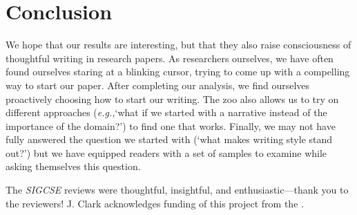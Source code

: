 \documentclass[sigconf]{acmart}
\newcommand{\eg}{\textit{e.g.,}\xspace}
\begin{document}
	\section{Conclusion}

We hope that our results are interesting, but that they also raise consciousness of thoughtful writing in research papers. 
As researchers ourselves, we have often found ourselves staring at a blinking cursor, trying to come up with a compelling way to start our paper. After completing our analysis, we find ourselves proactively choosing how to start our writing. The zoo also allows us to try on different approaches (\eg `what if we started with a narrative instead of the importance of the domain?') to find one that works. Finally, we may not have fully answered the question we started with (`what makes writing style stand out?') but we have equipped readers with a set of samples to examine while asking themselves this question. 
		
\begin{acks} 

The \textit{SIGCSE} reviews were thoughtful, insightful, and enthusiastic---thank you to the reviewers! J. Clark acknowledges funding of this project from the . 

\end{acks}


	
	
\end{document}
